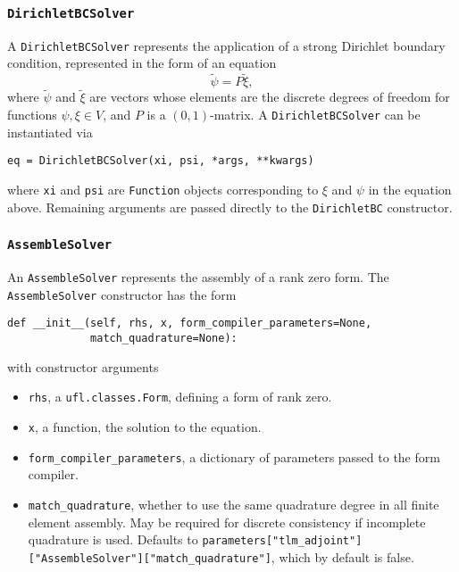 \documentclass[11pt]{article}
\begin{document}
\subsubsection{\texttt{DirichletBCSolver}}

A \texttt{DirichletBCSolver} represents the application of a strong Dirichlet
boundary condition, represented in the form of an equation
\begin{equation*}
  \tilde{\psi} = P \tilde{\xi},
\end{equation*}
where $\tilde{\psi}$ and $\tilde{\xi}$ are vectors whose elements are the
discrete degrees of freedom for functions $\psi, \xi \in V$, and $P$ is a
$\left( 0, 1 \right)$-matrix. A \texttt{DirichletBCSolver} can be instantiated
via
\begin{lstlisting}
eq = DirichletBCSolver(xi, psi, *args, **kwargs)
\end{lstlisting}
where \texttt{xi} and \texttt{psi} are \texttt{Function} objects corresponding
to $\xi$ and $\psi$ in the equation above. Remaining arguments are passed
directly to the \texttt{DirichletBC} constructor.

\subsubsection{\texttt{AssembleSolver}}\label{sect:AssembleSolver}

An \texttt{AssembleSolver} represents the assembly of a rank zero form. The
\texttt{AssembleSolver} constructor has the form
\begin{lstlisting}
def __init__(self, rhs, x, form_compiler_parameters=None,
             match_quadrature=None):
\end{lstlisting}
with constructor arguments
\begin{itemize}
  \item \texttt{rhs}, a \texttt{ufl.classes.Form}, defining a form of rank
    zero.
  \item \texttt{x}, a function, the solution to the equation.
  \item \texttt{form\_compiler\_parameters}, a dictionary of parameters passed
    to the form compiler.
  \item \texttt{match\_quadrature}, whether to use the same quadrature degree
    in all finite element assembly. May be required for discrete consistency if
    incomplete quadrature is used. Defaults to
    \texttt{parameters["tlm\_adjoint"]}\texttt{["AssembleSolver"]}\texttt{["match\_quadrature"]},
    which by default is false.
\end{itemize}
\end{document}
